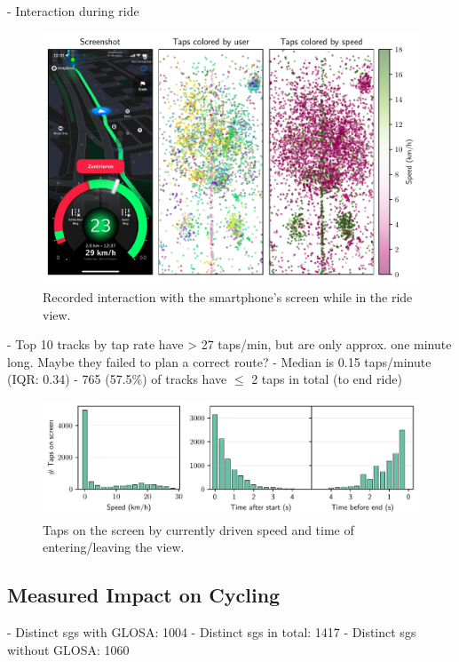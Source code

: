- Interaction during ride

\begin{figure}[t]
\caption{Recorded interaction with the smartphone's screen while in the ride view.}\label{fig:app-user-interaction}
\includegraphics[width=\linewidth]{images/app-user-interaction.pdf}
\end{figure}

- Top 10 tracks by tap rate have > 27 taps/min, but are only approx. one minute long. Maybe they failed to plan a correct route?
- Median is 0.15 taps/minute (IQR: 0.34)
- 765 (57.5\%) of tracks have $\leq$ 2 taps in total (to end ride)

\begin{figure}[t]
\caption{Taps on the screen by currently driven speed and time of entering/leaving the view.}\label{fig:app-user-interaction-speed}
\includegraphics[width=\linewidth]{images/app-user-interaction-speed.pdf}
\end{figure}


\subsection{Measured Impact on Cycling}

- Distinct sgs with GLOSA: 1004
- Distinct sgs in total: 1417
- Distinct sgs without GLOSA: 1060


